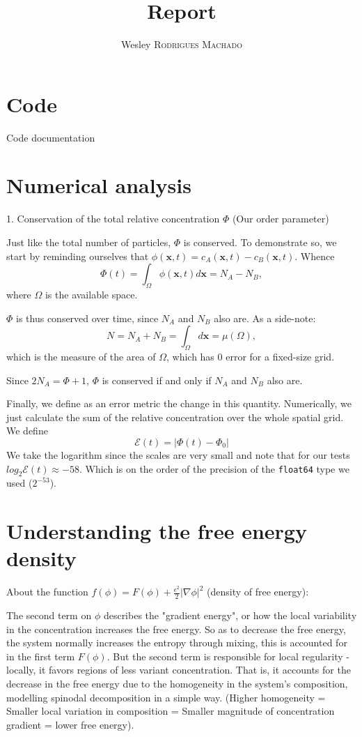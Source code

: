 \documentclass[a4paper]{article}
\begin{document}
\title{Report}
\author{Wesley \textsc{Rodrigues Machado}}


\tableofcontents
\pagebreak


\section{Code}
Code documentation

\section{Numerical analysis}

1. Conservation of the total relative concentration $\Phi$ (Our order parameter)

Just like the total number of particles, $\Phi$ is conserved.
To demonstrate so, we start by reminding ourselves that $\phi(\mathbf{x},t) = c_A(\mathbf{x},t)-c_B(\mathbf{x},t)$.
Whence \[ \Phi(t) = \int_{\Omega} \phi(\mathbf{x},t)d\mathbf{x} = N_A - N_B, \]
where $\Omega$ is the available space.

$\Phi$ is thus conserved over time, since $N_A$ and $N_B$ also are.
As a side-note: \[ N = N_A + N_B = \int_{\Omega} d\mathbf{x} = \mu(\Omega), \]
which is the measure of the area of $\Omega$, which has 0 error for a fixed-size grid.

Since $2N_A = \Phi+1$, $\Phi$ is conserved if and only if $N_A$ and $N_B$ also are.

Finally, we define as an error metric the change in this quantity.
Numerically, we just calculate the sum of the relative concentration over the whole spatial grid.
We define
\[ \mathcal{E}(t) = |\Phi(t) - \Phi_0| \]
We take the logarithm since the scales are very small and note that for our tests $log_{2}\mathcal{E}(t) \approx -58$.
Which is on the order of the precision of the \verb`float64` type we used ($2^{-53}$).



\section{Understanding the free energy density}
About the function $f(\phi) = F(\phi) + \frac{\epsilon^2}{2}|\nabla{\phi}|^2$ (density of free energy):

The second term on $\phi$ describes the "gradient energy", or how the local variability in the concentration increases the free energy.
So as to decrease the free energy, the system normally increases the entropy through mixing, this is accounted for in the first term $F(\phi)$.
But the second term is responsible for local regularity - locally, it favors regions of less variant concentration.
That is, it accounts for the decrease in the free energy due to the homogeneity in the system's composition, modelling spinodal decomposition in a simple way.
(Higher homogeneity = Smaller local variation in composition = Smaller magnitude of concentration gradient = lower free energy).
\end{document}
